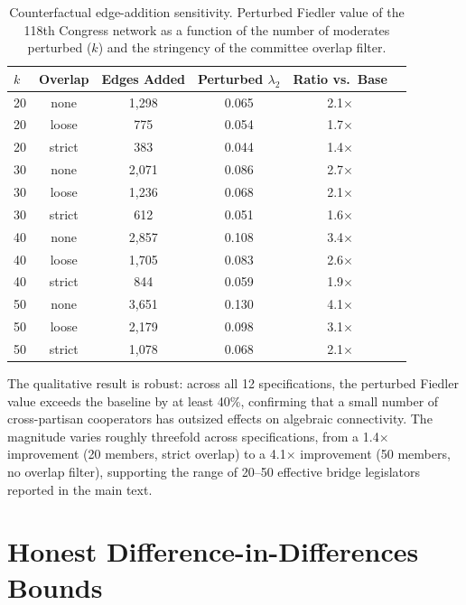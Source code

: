 \documentclass[12pt, a4paper]{article}
\begin{document}
\begin{table}[H]
\centering
\caption{Counterfactual edge-addition sensitivity. Perturbed Fiedler value of the 118th Congress network as a function of the number of moderates perturbed ($k$) and the stringency of the committee overlap filter.}
\label{tab:counterfactual_sensitivity}
\small
\begin{tabular}{lccccc}
\toprule
$k$ & Overlap & Edges Added & Perturbed $\lambda_2$ & Ratio vs.\ Base \\
\midrule
20 & none   & 1,298 & 0.065 & 2.1$\times$ \\
20 & loose  &   775 & 0.054 & 1.7$\times$ \\
20 & strict &   383 & 0.044 & 1.4$\times$ \\
\midrule
30 & none   & 2,071 & 0.086 & 2.7$\times$ \\
30 & loose  & 1,236 & 0.068 & 2.1$\times$ \\
30 & strict &   612 & 0.051 & 1.6$\times$ \\
\midrule
40 & none   & 2,857 & 0.108 & 3.4$\times$ \\
40 & loose  & 1,705 & 0.083 & 2.6$\times$ \\
40 & strict &   844 & 0.059 & 1.9$\times$ \\
\midrule
50 & none   & 3,651 & 0.130 & 4.1$\times$ \\
50 & loose  & 2,179 & 0.098 & 3.1$\times$ \\
50 & strict & 1,078 & 0.068 & 2.1$\times$ \\
\bottomrule
\end{tabular}
\end{table}

The qualitative result is robust: across all 12 specifications, the perturbed Fiedler value exceeds the baseline by at least 40\%, confirming that a small number of cross-partisan cooperators has outsized effects on algebraic connectivity. The magnitude varies roughly threefold across specifications, from a 1.4$\times$ improvement (20 members, strict overlap) to a 4.1$\times$ improvement (50 members, no overlap filter), supporting the range of 20--50 effective bridge legislators reported in the main text.

\section{Honest Difference-in-Differences Bounds}
\label{app:honest_did}
\end{document}
